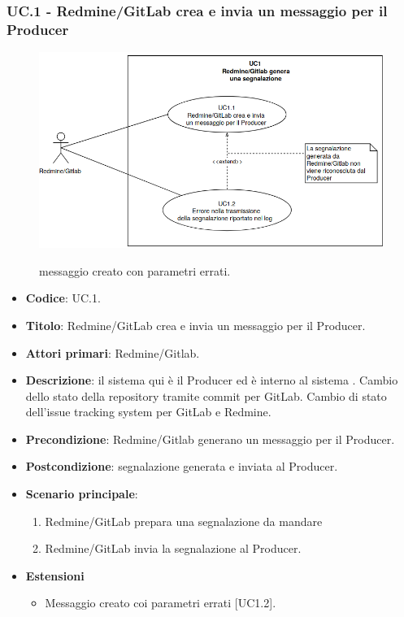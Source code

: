 \subsubsection{UC\theuccount.1 - Redmine/GitLab crea e invia un messaggio per il Producer}
    \begin{figure}[H]
		\centering
		\includegraphics[width=1\textwidth]{img/UC1_1.png}\\
		\caption{messaggio creato con parametri errati.}
	\end{figure}
	\begin{itemize}
		\item \textbf{Codice}: UC\theuccount.1.
		\item \textbf{Titolo}: Redmine/GitLab crea e invia un messaggio per il Producer.
		\item \textbf{Attori primari}: Redmine/Gitlab.
		\item \textbf{Descrizione}:
		il sistema qui è il Producer ed è interno al sistema \progetto. Cambio dello stato della repository tramite commit per GitLab. Cambio di stato dell'issue tracking system per GitLab e Redmine.
		\item \textbf{Precondizione}: Redmine/Gitlab generano un messaggio per il Producer.
		\item \textbf{Postcondizione}: segnalazione generata e inviata al Producer.
		\item \textbf{Scenario principale}: 
		\begin{enumerate}
			\item Redmine/GitLab prepara una segnalazione da mandare
			\item Redmine/GitLab invia la segnalazione al Producer.
		\end{enumerate}
		\item \textbf{Estensioni}
		\begin{itemize}
			\item Messaggio creato coi parametri errati [UC1.2].
		\end{itemize} 
	\end{itemize}


